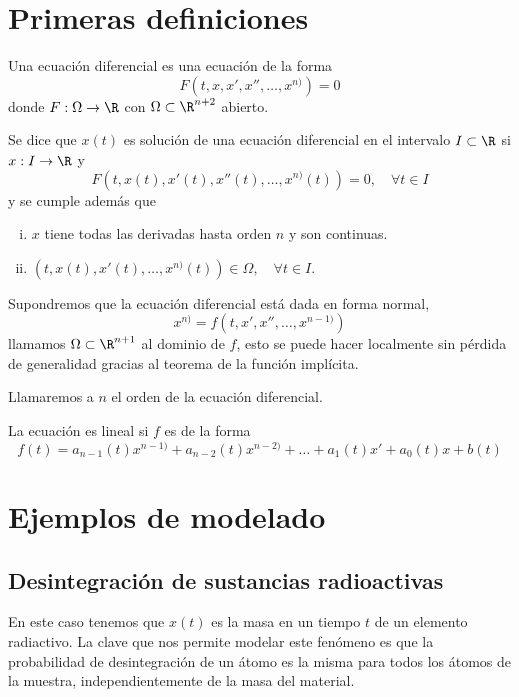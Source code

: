 \documentclass[../main.tex]{subfiles}
\begin{document}
\section{Primeras definiciones}

\begin{definition}
	Una ecuación diferencial es una ecuación de la forma 
	\[F(t, x, x', x'', \dots, x^{n)}) = 0\]
	donde \(F : \Omega \to \R\) con \(\Omega \subset \R^{n + 2}\) abierto.
\end{definition}

Se dice que \(x(t)\) es solución de una ecuación diferencial en el intervalo 
\(I \subset \R\) si \(x : I \to \R\) y
\[F(t, x(t), x'(t), x''(t), \dots, x^{n)}(t)) = 0, \quad \forall t \in I\]
y se cumple además que
\begin{enumerate}[i)]
	\item \(x\) tiene todas las derivadas hasta orden \(n\) y son continuas.
	\item \((t, x(t), x'(t), \dots, x^{n)}(t)) \in \Omega, \quad \forall t \in I\).
\end{enumerate}

Supondremos que la ecuación diferencial está dada en forma normal,
\[x^{n)} = f(t, x', x'', \dots, x^{n - 1)})\]
llamamos \(\Omega \subset \R^{n + 1}\) al dominio de \(f\), esto se puede hacer
localmente sin pérdida de generalidad gracias al teorema de la función
implícita.

\begin{definition}
	Llamaremos a \(n\) el orden de la ecuación diferencial.
\end{definition}

\begin{definition}
	La ecuación es lineal si \(f\) es de la forma
	\[f(t) = a_{n - 1}(t)x^{n - 1)} + a_{n - 2}(t)x^{n - 2)} + 
		\dots + a_1(t)x' + a_0(t)x + b(t)\]
\end{definition}

\section{Ejemplos de modelado}

\subsection{Desintegración de sustancias radioactivas}

En este caso tenemos que \(x(t)\) es
la masa en un tiempo \(t\) de un elemento radiactivo. La clave que nos permite
modelar este fenómeno es que la probabilidad de desintegración de un átomo es la
misma para todos los átomos de la muestra, independientemente de la masa del
material.
\end{document}
